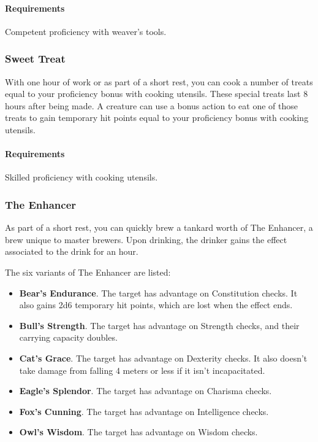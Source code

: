     \paragraph{Requirements} Competent proficiency with weaver's tools.
\subsubsection{Sweet Treat} \label{feat::sweettreat}
    With one hour of work or as part of a short rest, you can cook a number of treats equal to your proficiency bonus with cooking utensils.
    These special treats last 8 hours after being made.
    A creature can use a bonus action to eat one of those treats to gain temporary hit points equal to your proficiency bonus with cooking utensils.
    \paragraph{Requirements} Skilled proficiency with cooking utensils.
\subsubsection{The Enhancer} \label{feat::theenhancer}
    As part of a short rest, you can quickly brew a tankard worth of The Enhancer, a brew unique to master brewers.
    Upon drinking, the drinker gains the effect associated to the drink for an hour.

    The six variants of The Enhancer are listed:
    \begin{itemize}
        \item \textbf{Bear's Endurance}.
            The target has advantage on Constitution checks.
            It also gains 2d6 temporary hit points, which are lost when the effect ends.
        \item \textbf{Bull's Strength}.
            The target has advantage on Strength checks, and their carrying capacity doubles.
        \item \textbf{Cat's Grace}.
            The target has advantage on Dexterity checks.
            It also doesn't take damage from falling 4 meters or less if it isn't incapacitated.
        \item \textbf{Eagle's Splendor}.
            The target has advantage on Charisma checks.
        \item \textbf{Fox's Cunning}.
            The target has advantage on Intelligence checks.
        \item \textbf{Owl's Wisdom}.
            The target has advantage on Wisdom checks.
    \end{itemize}

